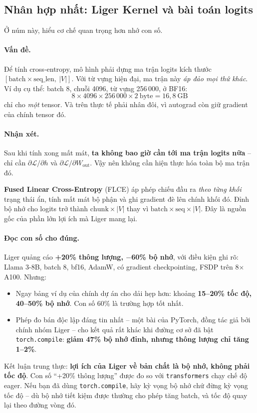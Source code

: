 \subsection{Nhân hợp nhất: Liger Kernel và bài toán logits}
\label{ssec:liger}

Ở núm này, hiểu cơ chế quan trọng hơn nhớ con số.

\paragraph{Vấn đề.} Để tính cross-entropy, mô hình phải dựng ma trận logits kích thước $[\text{batch} \times \text{seq\_len},\ |V|]$. Với từ vựng hiện đại, ma trận này \emph{áp đảo mọi thứ khác}. Ví dụ cụ thể: batch 8, chuỗi 4096, từ vựng 256\,000, ở BF16:
\[
8 \times 4096 \times 256\,000 \times 2\ \text{byte} = 16{,}8\ \text{GB}
\]
chỉ cho \emph{một} tensor. Và trên thực tế phải nhân đôi, vì autograd còn giữ gradient của chính tensor đó.

\paragraph{Nhận xét.} Sau khi tính xong mất mát, \textbf{ta không bao giờ cần tới ma trận logits nữa} -- chỉ cần $\partial \mathcal{L}/\partial h$ và $\partial \mathcal{L}/\partial W_{\text{out}}$. Vậy nên không cần hiện thực hóa toàn bộ ma trận đó.

\textbf{Fused Linear Cross-Entropy} (FLCE) áp phép chiếu đầu ra \emph{theo từng khối} trạng thái ẩn, tính mất mát bộ phận và ghi gradient đè lên chính khối đó. Đỉnh bộ nhớ cho logits trở thành $\text{chunk} \times |V|$ thay vì $\text{batch} \times \text{seq} \times |V|$. Đây là nguồn gốc của phần lớn lợi ích mà Liger mang lại.

\paragraph{Đọc con số cho đúng.} Liger quảng cáo \textbf{+20\% thông lượng, $-$60\% bộ nhớ}, với điều kiện ghi rõ: Llama 3-8B, batch 8, bf16, AdamW, có gradient checkpointing, FSDP trên 8$\times$A100. Nhưng:
\begin{itemize}
	\item Ngay bảng ví dụ của chính dự án cho dải hẹp hơn: khoảng \textbf{15--20\% tốc độ, 40--50\% bộ nhớ}. Con số 60\% là trường hợp tốt nhất.
	\item Phép đo bán độc lập đáng tin nhất -- một bài của PyTorch, đồng tác giả bởi chính nhóm Liger -- cho kết quả rất khác khi đường cơ sở đã bật \texttt{torch.compile}: \textbf{giảm 47\% bộ nhớ đỉnh, nhưng thông lượng chỉ tăng 1--2\%}.
\end{itemize}
Kết luận trung thực: \textbf{lợi ích của Liger về bản chất là bộ nhớ, không phải tốc độ}. Con số “+20\% thông lượng” được đo so với \texttt{transformers} chạy chế độ eager. Nếu bạn đã dùng \texttt{torch.compile}, hãy kỳ vọng bộ nhớ chứ đừng kỳ vọng tốc độ -- dù bộ nhớ tiết kiệm được thường cho phép tăng batch, và tốc độ quay lại theo đường vòng đó.

